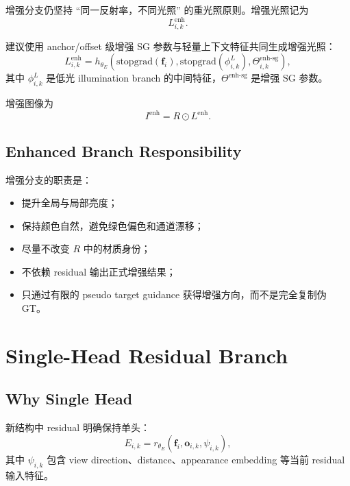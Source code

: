 \documentclass[11pt]{article}
\begin{document}
增强分支仍坚持 ``同一反射率，不同光照'' 的重光照原则。增强光照记为
\begin{equation}
    L^{\text{enh}}_{i,k}.
\end{equation}

建议使用 anchor/offset 级增强 SG 参数与轻量上下文特征共同生成增强光照：
\begin{equation}
    L^{\text{enh}}_{i,k}
    =
    h_{\theta_E}
    \left(
        \mathrm{stopgrad}(\mathbf{f}_i),
        \mathrm{stopgrad}(\phi^L_{i,k}),
        \Theta^{\text{enh-sg}}_{i,k}
    \right),
\end{equation}
其中 $\phi^L_{i,k}$ 是低光 illumination branch 的中间特征，$\Theta^{\text{enh-sg}}$ 是增强 SG 参数。

增强图像为
\begin{equation}
    I^{\text{enh}} = R \odot L^{\text{enh}}.
\end{equation}

\subsection{Enhanced Branch Responsibility}

增强分支的职责是：
\begin{itemize}[leftmargin=1.5em]
    \item 提升全局与局部亮度；
    \item 保持颜色自然，避免绿色偏色和通道漂移；
    \item 尽量不改变 $R$ 中的材质身份；
    \item 不依赖 residual 输出正式增强结果；
    \item 只通过有限的 pseudo target guidance 获得增强方向，而不是完全复制伪 GT。
\end{itemize}

\section{Single-Head Residual Branch}

\subsection{Why Single Head}

新结构中 residual 明确保持单头：
\begin{equation}
    E_{i,k} = r_{\theta_E}\left(\mathbf{f}_i, \mathbf{o}_{i,k}, \psi_{i,k}\right),
\end{equation}
其中 $\psi_{i,k}$ 包含 view direction、distance、appearance embedding 等当前 residual 输入特征。
\end{document}
